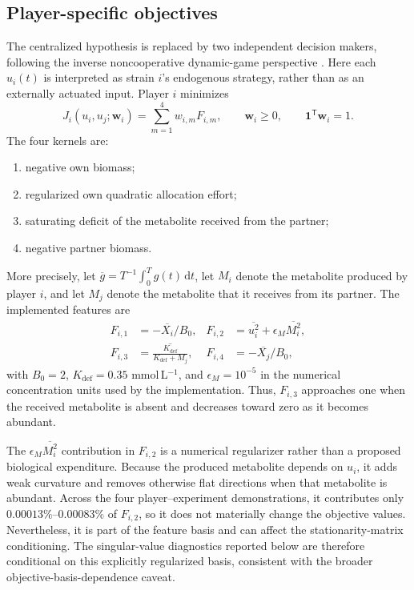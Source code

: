 \documentclass[11pt,a4paper]{article}
\newcommand{\vect}[1]{\boldsymbol{#1}}
\begin{document}
\subsection{Player-specific objectives}

The centralized hypothesis is replaced by two independent decision makers,
following the inverse noncooperative dynamic-game perspective
\cite{Molloy2022}. Here each \(u_i(t)\) is interpreted as strain \(i\)'s
endogenous strategy, rather than as an externally actuated input. Player \(i\)
minimizes
\begin{equation}
  J_i(u_i,u_j;\vect{w}_i)
  =
  \sum_{m=1}^{4}w_{i,m}F_{i,m},
  \qquad
  \vect{w}_i\ge0,\qquad
  \vect{1}^{\mathsf T}\vect{w}_i=1.
\end{equation}
The four kernels are:
\begin{enumerate}
  \item negative own biomass;
  \item regularized own quadratic allocation effort;
  \item saturating deficit of the metabolite received from the partner;
  \item negative partner biomass.
\end{enumerate}
More precisely, let
\(\overline{g}=T^{-1}\int_0^T g(t)\,\mathrm{d}t\), let \(M_i\) denote the
metabolite produced by player \(i\), and let \(M_j\) denote the metabolite
that it receives from its partner. The implemented features are
\begin{align}
  F_{i,1} &= -\overline{X_i}/B_0,
  &
  F_{i,2} &= \overline{u_i^2}
             +\epsilon_M\overline{M_i^2},\\
  F_{i,3} &= \overline{\frac{K_{\mathrm{def}}}
                                  {K_{\mathrm{def}}+M_j}},
  &
  F_{i,4} &= -\overline{X_j}/B_0,
\end{align}
with \(B_0=2\), \(K_{\mathrm{def}}=0.35\) mmol\,L\(^{-1}\), and
\(\epsilon_M=10^{-5}\) in the numerical concentration units used by the
implementation. Thus, \(F_{i,3}\) approaches one when the received metabolite
is absent and decreases toward zero as it becomes abundant.

The \(\epsilon_M\overline{M_i^2}\) contribution in \(F_{i,2}\) is a numerical
regularizer rather than a proposed biological expenditure. Because the
produced metabolite depends on \(u_i\), it adds weak curvature and removes
otherwise flat directions when that metabolite is abundant. Across the four
player--experiment demonstrations, it contributes only
\(0.00013\%\)--\(0.00083\%\) of \(F_{i,2}\), so it does not materially change
the objective values. Nevertheless, it is part of the feature basis and can
affect the stationarity-matrix conditioning. The singular-value diagnostics
reported below are therefore conditional on this explicitly regularized
basis, consistent with the broader objective-basis-dependence caveat.
\end{document}
